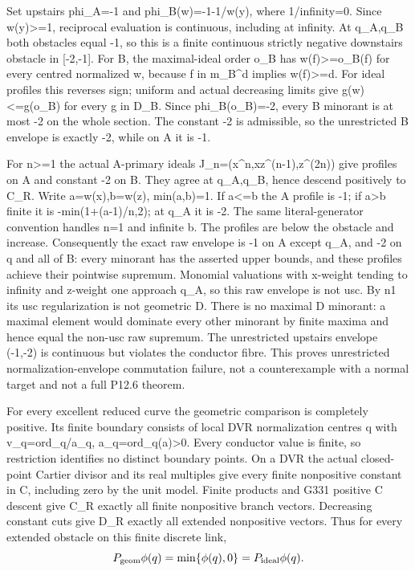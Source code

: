 \documentclass[11pt]{article}
\begin{document}
Set upstairs phi\_A=-1 and phi\_B(w)=-1-1/w(y), where 1/infinity=0. Since w(y)>=1, reciprocal evaluation is continuous, including at infinity. At q\_A,q\_B both obstacles equal -1, so this is a finite continuous strictly negative downstairs obstacle in [-2,-1]. For B, the maximal-ideal order o\_B has w(f)>=o\_B(f) for every centred normalized w, because f in m\_B\textasciicircum{}d implies w(f)>=d. For ideal profiles this reverses sign; uniform and actual decreasing limits give g(w)<=g(o\_B) for every g in D\_B. Since phi\_B(o\_B)=-2, every B minorant is at most -2 on the whole section. The constant -2 is admissible, so the unrestricted B envelope is exactly -2, while on A it is -1.

For n>=1 the actual A-primary ideals J\_n=(x\textasciicircum{}n,xz\textasciicircum{}(n-1),z\textasciicircum{}(2n)) give profiles on A and constant -2 on B. They agree at q\_A,q\_B, hence descend positively to C\_R. Write a=w(x),b=w(z), min(a,b)=1. If a<=b the A profile is -1; if a>b finite it is -min(1+(a-1)/n,2); at q\_A it is -2. The same literal-generator convention handles n=1 and infinite b. The profiles are below the obstacle and increase. Consequently the exact raw envelope is -1 on A except q\_A, and -2 on q and all of B: every minorant has the asserted upper bounds, and these profiles achieve their pointwise supremum. Monomial valuations with x-weight tending to infinity and z-weight one approach q\_A, so this raw envelope is not usc. By n1 its usc regularization is not geometric D. There is no maximal D minorant: a maximal element would dominate every other minorant by finite maxima and hence equal the non-usc raw supremum. The unrestricted upstairs envelope (-1,-2) is continuous but violates the conductor fibre. This proves unrestricted normalization-envelope commutation failure, not a counterexample with a normal target and not a full P12.6 theorem.

For every excellent reduced curve the geometric comparison is completely positive. Its finite boundary consists of local DVR normalization centres q with v\_q=ord\_q/a\_q, a\_q=ord\_q(a)>0. Every conductor value is finite, so restriction identifies no distinct boundary points. On a DVR the actual closed-point Cartier divisor and its real multiples give every finite nonpositive constant in C, including zero by the unit model. Finite products and G331 positive C descent give C\_R exactly all finite nonpositive branch vectors. Decreasing constant cuts give D\_R exactly all extended nonpositive vectors. Thus for every extended obstacle on this finite discrete link,
\[
P_{\rm geom}\phi(q)=\min\{\phi(q),0\}=P_{\rm ideal}\phi(q).
\]
\end{document}

